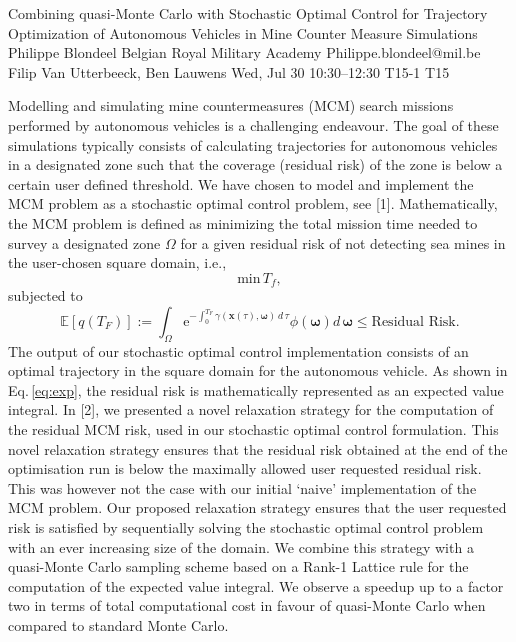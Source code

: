 \begin{talk}
  {Combining quasi-Monte Carlo with Stochastic Optimal Control for Trajectory Optimization of Autonomous Vehicles in Mine Counter Measure Simulations}%
  {Philippe Blondeel}%
  {Belgian Royal Military Academy}%
  {Philippe.blondeel@mil.be}%
  {Filip Van Utterbeeck, Ben Lauwens}%
  {}%
  {Wed, Jul 30 10:30–12:30}%
  {T15-1}%
  {T15}%
  
				
			
Modelling and simulating mine countermeasures (MCM) search missions performed by autonomous vehicles is a challenging endeavour. The goal of these simulations typically consists of calculating trajectories for autonomous vehicles in a designated zone such that the coverage (residual risk) of the zone is below a certain user defined threshold. We have chosen to model and implement the MCM problem as a stochastic optimal control problem, see [1]. Mathematically, the MCM problem is defined as minimizing the total mission time needed to survey a designated zone $\Omega$ for a given residual risk of not detecting sea mines in the  user-chosen square  domain, i.e., 
\begin{equation}
\text{min}\, T_f,
\label{eq:min}
\end{equation}
subjected to
\begin{equation}
 \mathbb{E}[q\left(T_F\right)] :=  \int_\Omega \text{e}^{-\int_0^{T_F} \gamma\left(\bm{x}\left(\tau\right),\bm{\omega}\right)\, d\,\tau}\phi\left(\bm{\omega}\right) d\,\bm{\omega} \leq \text{Residual Risk}.
\label{eq:exp}
\end{equation}
The output of our stochastic optimal control implementation consists of an optimal trajectory in the square domain for the autonomous vehicle.  As shown in Eq.\,\eqref{eq:exp}, the residual risk is mathematically represented as an expected value integral. In [2], we presented a novel relaxation strategy for the computation of the residual MCM risk, used in our stochastic optimal control formulation. This novel relaxation strategy ensures that the  residual risk obtained at the end of the optimisation run is below the maximally allowed user requested residual risk. This was however not the case  with our initial `naive' implementation of the MCM problem. Our proposed relaxation strategy ensures that the user requested risk is satisfied by sequentially solving the stochastic optimal control problem with an ever increasing size of the domain. We combine this strategy with  a quasi-Monte Carlo  sampling scheme based on a Rank-1 Lattice rule for the computation of the expected value integral. We observe a speedup up to a factor two in terms of total computational cost in favour of quasi-Monte Carlo when compared to standard Monte Carlo.



\end{talk}
